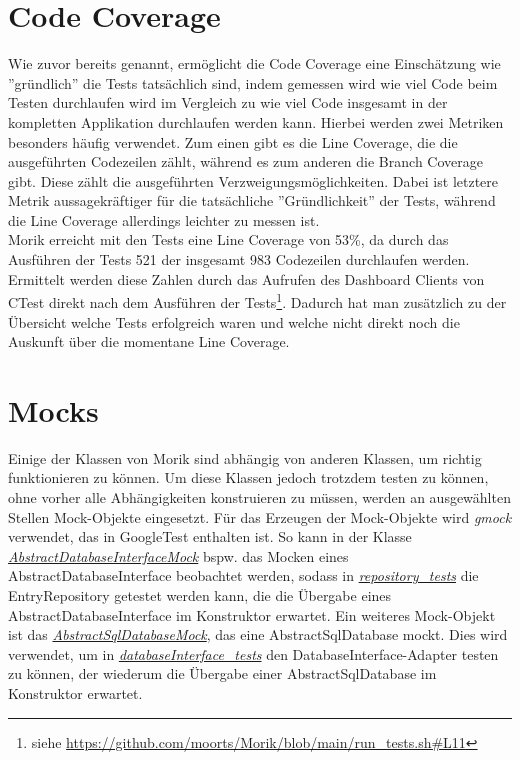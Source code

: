 \section{Code Coverage}
Wie zuvor bereits genannt, ermöglicht die Code Coverage eine Einschätzung wie ''gründlich'' die Tests tatsächlich sind, indem gemessen wird wie viel Code beim Testen durchlaufen wird im Vergleich zu wie viel Code insgesamt in der kompletten Applikation durchlaufen werden kann. Hierbei werden zwei Metriken besonders häufig verwendet. Zum einen gibt es die Line Coverage, die die ausgeführten Codezeilen zählt, während es zum anderen die Branch Coverage gibt. Diese zählt die ausgeführten Verzweigungsmöglichkeiten. Dabei ist letztere Metrik aussagekräftiger für die tatsächliche ''Gründlichkeit'' der Tests, während die Line Coverage allerdings leichter zu messen ist.\\
Morik erreicht mit den Tests eine Line Coverage von 53\%, da durch das Ausführen der Tests 521 der insgesamt 983 Codezeilen durchlaufen werden.  Ermittelt werden diese Zahlen durch das Aufrufen des Dashboard Clients von CTest direkt nach dem Ausführen der Tests\footnote{siehe \url{https://github.com/moorts/Morik/blob/main/run_tests.sh\#L11}}. Dadurch hat man zusätzlich zu der Übersicht welche Tests erfolgreich waren und welche nicht direkt noch die Auskunft über die momentane Line Coverage.

\section{Mocks}
Einige der Klassen von Morik sind abhängig von anderen Klassen, um richtig funktionieren zu können. Um diese Klassen jedoch trotzdem testen zu können, ohne vorher alle Abhängigkeiten konstruieren zu müssen, werden an ausgewählten Stellen Mock-Objekte eingesetzt. Für das Erzeugen der Mock-Objekte wird \textit{gmock} verwendet, das in GoogleTest enthalten ist. So kann in der Klasse \href{https://github.com/moorts/Morik/blob/main/src/tests/application/AbstractDatabaseInterfaceMock.h}{\textit{AbstractDatabaseInterfaceMock}} bspw. das Mocken eines AbstractDatabaseInterface beobachtet werden, sodass in \href{https://github.com/moorts/Morik/blob/main/src/tests/application/repository_tests.cpp}{\textit{repository\_tests}} die EntryRepository getestet werden kann, die die Übergabe eines AbstractDatabaseInterface im Konstruktor erwartet. Ein weiteres Mock-Objekt ist das \href{https://github.com/moorts/Morik/blob/main/src/tests/adapters/database/AbstractSqlDatabaseMock.h}{\textit{AbstractSqlDatabaseMock}}, das eine AbstractSqlDatabase mockt. Dies wird verwendet, um in \href{https://github.com/moorts/Morik/blob/main/src/tests/adapters/database/databaseInterface_tests.cpp}{\textit{databaseInterface\_tests}} den DatabaseInterface-Adapter testen zu können, der wiederum die Übergabe einer AbstractSqlDatabase im Konstruktor erwartet.
